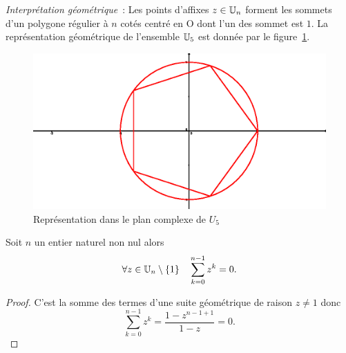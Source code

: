 \emph{Interprétation géométrique}~: Les points d'affixes $z \in \mathbb{U}_n$ forment les sommets d'un polygone régulier à $n$ cotés centré en O dont l'un des sommet est $1$. La représentation géométrique de l'ensemble $\mathbb{U}_5$ est donnée par le figure~\ref{fig:racinesnieme}.
\begin{figure}
  \centering
  \includegraphics[width=\textwidth, scale=1]{racines-nieme.eps}
  \caption{Représentation dans le plan complexe de $U_5$}
  \label{fig:racinesnieme}
\end{figure}

\begin{theo}
  Soit $n$ un entier naturel non nul alors
  \begin{equation}
    \forall z \in \mathbb{U}_n \setminus \{1\} \quad \sum_{k=0}^{n-1} z^k = 0.
  \end{equation}
\end{theo}
\begin{proof}
  C'est la somme des termes d'une suite géométrique de raison $z \neq 1$ donc
  \begin{equation}
    \sum_{k=0}^{n-1} z^k = \frac{1-z^{n-1+1}}{1-z} = 0.
  \end{equation}
\end{proof}

